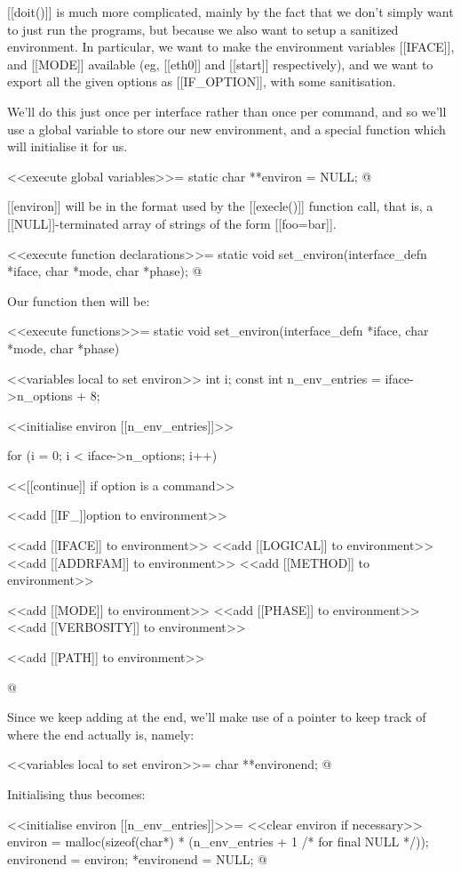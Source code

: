 \documentclass{article}
\begin{document}
[[doit()]] is much more complicated, mainly by the fact that we
don't simply want to just run the programs, but because we also want
to setup a sanitized environment. In particular, we want to make the
environment variables [[IFACE]], and [[MODE]] available (eg, [[eth0]] and
[[start]] respectively), and we want to export all the given options as
[[IF_OPTION]], with some sanitisation.

We'll do this just once per interface rather than once per command,
and so we'll use a global variable to store our new environment, and a
special function which will initialise it for us.

<<execute global variables>>=
static char **environ = NULL;
@ 

[[environ]] will be in the format used by the [[execle()]] function call,
that is, a [[NULL]]-terminated array of strings of the form [[foo=bar]].

<<execute function declarations>>=
static void set_environ(interface_defn *iface, char *mode, char *phase);
@

Our function then will be:

<<execute functions>>=
static void set_environ(interface_defn *iface, char *mode, char *phase) {
	<<variables local to set environ>>
	int i;
	const int n_env_entries = iface->n_options + 8;

	<<initialise environ [[n_env_entries]]>>

	for (i = 0; i < iface->n_options; i++) {
		<<[[continue]] if option is a command>>

		<<add [[IF_]]option to environment>>
	}

	<<add [[IFACE]] to environment>>
	<<add [[LOGICAL]] to environment>>
	<<add [[ADDRFAM]] to environment>>
	<<add [[METHOD]] to environment>>

	<<add [[MODE]] to environment>>
	<<add [[PHASE]] to environment>>
	<<add [[VERBOSITY]] to environment>>

	<<add [[PATH]] to environment>>
}
@

Since we keep adding at the end, we'll make use of a pointer to keep track
of where the end actually is, namely:

<<variables local to set environ>>=
char **environend;
@

Initialising thus becomes:

<<initialise environ [[n_env_entries]]>>=
<<clear environ if necessary>>
environ = malloc(sizeof(char*) * (n_env_entries + 1 /* for final NULL */));
environend = environ; 
*environend = NULL;
@
\end{document}
